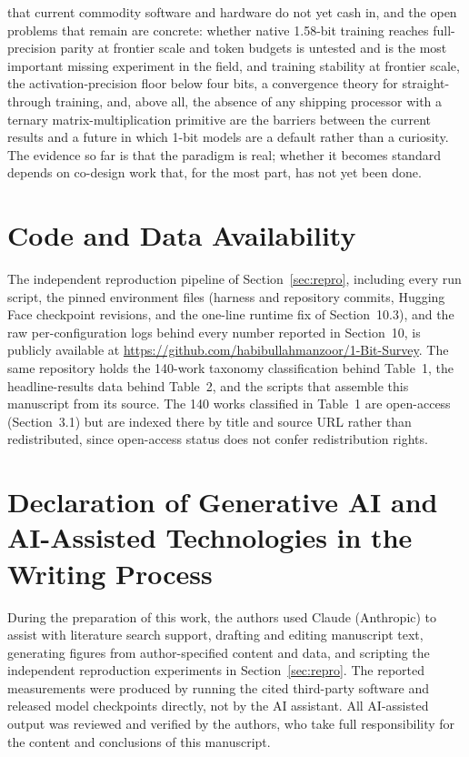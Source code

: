 \documentclass[11pt]{article}
\begin{document}
that current commodity software and hardware do not yet cash in, and the open problems
that remain are concrete: whether native 1.58-bit training reaches full-precision parity
at frontier scale and token budgets is untested and is the most important missing
experiment in the field, and training stability at frontier scale, the
activation-precision floor below four bits, a convergence theory for straight-through
training, and, above all, the absence of any shipping processor with a ternary
matrix-multiplication primitive are the barriers between the current results and a future
in which 1-bit models are a default rather than a curiosity. The evidence so far is that
the paradigm is real; whether it becomes standard depends on co-design work that, for the
most part, has not yet been done.


\section*{Code and Data Availability}

The independent reproduction pipeline of Section~\ref{sec:repro}, including every run
script, the pinned environment files (harness and repository commits, Hugging Face
checkpoint revisions, and the one-line runtime fix of Section~10.3), and the raw
per-configuration logs behind every number reported in Section~10, is publicly available
at \href{https://github.com/habibullahmanzoor/1-Bit-Survey}{https://github.com/habibullahmanzoor/1-Bit-Survey}.
The same repository holds the 140-work taxonomy classification behind Table~1, the
headline-results data behind Table~2, and the scripts that assemble this manuscript from
its source. The 140 works classified in Table~1 are open-access (Section~3.1) but are
indexed there by title and source URL rather than redistributed, since open-access status
does not confer redistribution rights.


\section*{Declaration of Generative AI and AI-Assisted Technologies in the Writing Process}

During the preparation of this work, the authors used Claude (Anthropic) to assist with
literature search support, drafting and editing manuscript text, generating figures from
author-specified content and data, and scripting the independent reproduction experiments
in Section~\ref{sec:repro}. The reported measurements were produced by running the cited
third-party software and released model checkpoints directly, not by the AI assistant.
All AI-assisted output was reviewed and verified by the authors, who take full
responsibility for the content and conclusions of this manuscript.



\end{document}
